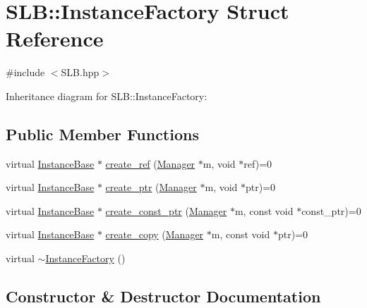 \hypertarget{structSLB_1_1InstanceFactory}{}\section{S\+LB\+:\+:Instance\+Factory Struct Reference}
\label{structSLB_1_1InstanceFactory}


{\ttfamily \#include $<$S\+L\+B.\+hpp$>$}



Inheritance diagram for S\+LB\+:\+:Instance\+Factory\+:
\subsection*{Public Member Functions}
\begin{DoxyCompactItemize}
\item 
virtual \hyperlink{classSLB_1_1InstanceBase}{Instance\+Base} $\ast$ \hyperlink{structSLB_1_1InstanceFactory_af914a384d41374c19188c581619c71ce}{create\+\_\+ref} (\hyperlink{classSLB_1_1Manager}{Manager} $\ast$m, void $\ast$ref)=0
\item 
virtual \hyperlink{classSLB_1_1InstanceBase}{Instance\+Base} $\ast$ \hyperlink{structSLB_1_1InstanceFactory_a976ce6eb76b08502f18fb398dcaf86f3}{create\+\_\+ptr} (\hyperlink{classSLB_1_1Manager}{Manager} $\ast$m, void $\ast$ptr)=0
\item 
virtual \hyperlink{classSLB_1_1InstanceBase}{Instance\+Base} $\ast$ \hyperlink{structSLB_1_1InstanceFactory_ad6ea783b37bb1d9dec5f1f0607cd4eff}{create\+\_\+const\+\_\+ptr} (\hyperlink{classSLB_1_1Manager}{Manager} $\ast$m, const void $\ast$const\+\_\+ptr)=0
\item 
virtual \hyperlink{classSLB_1_1InstanceBase}{Instance\+Base} $\ast$ \hyperlink{structSLB_1_1InstanceFactory_a78319c400603105ea9869fb1bb4a2803}{create\+\_\+copy} (\hyperlink{classSLB_1_1Manager}{Manager} $\ast$m, const void $\ast$ptr)=0
\item 
virtual \hyperlink{structSLB_1_1InstanceFactory_aa5ca50f0a85a31a73d25e4378fca59e5}{$\sim$\+Instance\+Factory} ()
\end{DoxyCompactItemize}


\subsection{Constructor \& Destructor Documentation}
